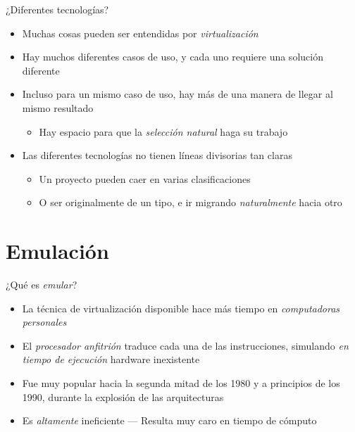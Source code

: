 \documentclass[presentation]{beamer}
\begin{document}
\begin{frame}[label={sec:orgd72afb5}]{¿Diferentes tecnologías?}
\begin{itemize}
\item Muchas cosas pueden ser entendidas por \emph{virtualización}
\item Hay muchos diferentes casos de uso, y cada uno requiere una
solución diferente
\item Incluso para un mismo caso de uso, hay más de una manera de llegar
al mismo resultado
\begin{itemize}
\item Hay espacio para que la \emph{selección natural} haga su trabajo
\end{itemize}
\item Las diferentes tecnologías no tienen líneas divisorias tan claras
\begin{itemize}
\item Un proyecto pueden caer en varias clasificaciones
\item O ser originalmente de un tipo, e ir migrando \emph{naturalmente}
hacia otro
\end{itemize}
\end{itemize}
\end{frame}

\section{Emulación}
\label{sec:org948526b}
\begin{frame}[label={sec:org993e167}]{¿Qué es \emph{emular}?}
\begin{itemize}
\item La técnica de virtualización disponible hace más tiempo en
\emph{computadoras personales}
\item El \emph{procesador anfitrión} traduce cada una de las instrucciones,
simulando \emph{en tiempo de ejecución} hardware inexistente
\item Fue muy popular hacia la segunda mitad de los 1980 y a principios de
los 1990, durante la explosión de las arquitecturas
\item Es \emph{altamente} ineficiente — Resulta muy caro en tiempo de cómputo
\end{itemize}
\end{frame}
\end{document}
